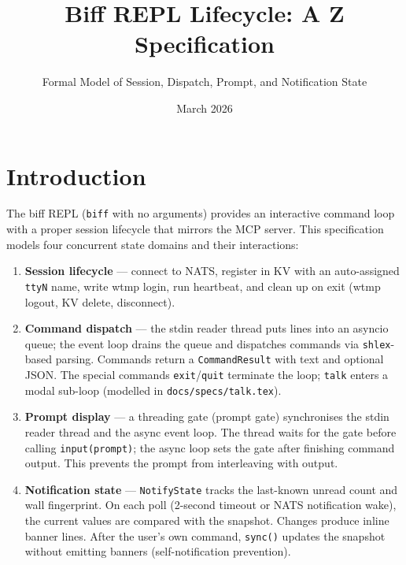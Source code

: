 \documentclass[a4paper,10pt,fleqn]{article}
\begin{document}
\title{Biff REPL Lifecycle: A Z Specification}
\author{Formal Model of Session, Dispatch, Prompt, and Notification State}
\date{March 2026}
\maketitle

\tableofcontents
\newpage

\section{Introduction}

The biff REPL (\texttt{biff} with no arguments) provides an interactive
command loop with a proper session lifecycle that mirrors the MCP
server.  This specification models four concurrent state domains and
their interactions:

\begin{enumerate}
\item \textbf{Session lifecycle} --- connect to NATS, register in KV
  with an auto-assigned \texttt{ttyN} name, write wtmp login, run
  heartbeat, and clean up on exit (wtmp logout, KV delete, disconnect).

\item \textbf{Command dispatch} --- the stdin reader thread puts lines
  into an asyncio queue; the event loop drains the queue and dispatches
  commands via \texttt{shlex}-based parsing.  Commands return a
  \texttt{CommandResult} with text and optional JSON.  The special
  commands \texttt{exit}/\texttt{quit} terminate the loop; \texttt{talk}
  enters a modal sub-loop (modelled in \texttt{docs/specs/talk.tex}).

\item \textbf{Prompt display} --- a threading gate (prompt gate)
  synchronises the stdin reader thread and the async event loop.
  The thread waits for the gate before calling \texttt{input(prompt)};
  the async loop sets the gate after finishing command output.  This
  prevents the prompt from interleaving with output.

\item \textbf{Notification state} --- \texttt{NotifyState} tracks the
  last-known unread count and wall fingerprint.  On each poll (2-second
  timeout or NATS notification wake), the current values are compared
  with the snapshot.  Changes produce inline banner lines.  After the
  user's own command, \texttt{sync()} updates the snapshot without
  emitting banners (self-notification prevention).
\end{enumerate}
\end{document}
